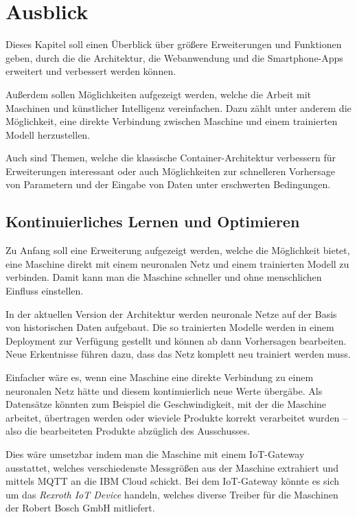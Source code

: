 \chapter{Ausblick}
\label{ch:ausblick}
Dieses Kapitel soll einen Überblick über größere Erweiterungen und Funktionen geben, durch die die Architektur, die
Webanwendung und die Smartphone-Apps erweitert und verbessert werden können.

Außerdem sollen Möglichkeiten aufgezeigt werden, welche die Arbeit mit Maschinen und künstlicher Intelligenz
vereinfachen. Dazu zählt unter anderem die Möglichkeit, eine direkte Verbindung zwischen Maschine und einem trainierten
Modell herzustellen.

Auch sind Themen, welche die klassische Container-Architektur verbessern für Erweiterungen interessant oder
auch Möglichkeiten zur schnelleren Vorhersage von Parametern und der Eingabe von Daten unter erschwerten Bedingungen.

\section{Kontinuierliches Lernen und Optimieren}
Zu Anfang soll eine Erweiterung aufgezeigt werden, welche die Möglichkeit bietet, eine Maschine direkt mit einem
neuronalen Netz und einem trainierten Modell zu verbinden. Damit kann man die Maschine schneller und ohne menschlichen
Einfluss einstellen.

In der aktuellen Version der Architektur werden neuronale Netze auf der Basis von historischen Daten aufgebaut. Die so
trainierten Modelle werden in einem Deployment zur Verfügung gestellt und können ab dann Vorhersagen bearbeiten. Neue
Erkentnisse führen dazu, dass das Netz komplett neu trainiert werden muss.

Einfacher wäre es, wenn eine Maschine eine direkte Verbindung zu einem neuronalen Netz hätte und diesem kontinuierlich
neue Werte übergäbe. Als Datensätze könnten zum Beispiel die Geschwindigkeit, mit der die Maschine arbeitet, übertragen
werden oder wieviele Produkte korrekt verarbeitet wurden -- also die bearbeiteten Produkte abzüglich des Ausschusses.

Dies wäre umsetzbar indem man die Maschine mit einem IoT-Gateway ausstattet, welches verschiedenste Messgrößen aus der
Maschine extrahiert und mittels MQTT an die IBM Cloud schickt. Bei dem IoT-Gateway könnte es sich um das
\textit{Rexroth IoT Device} handeln, welches diverse Treiber für die Maschinen der Robert Bosch GmbH mitliefert.

